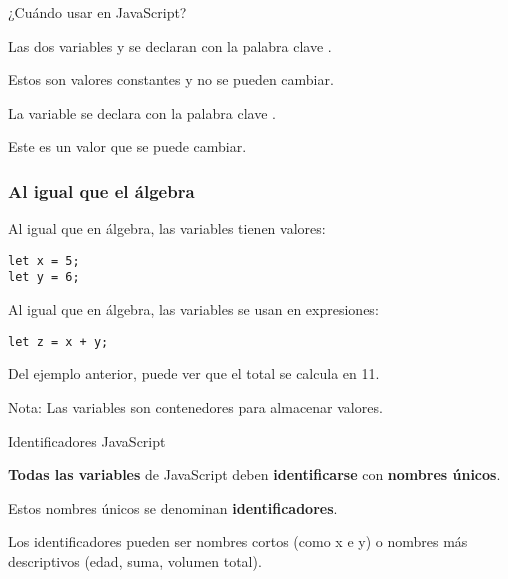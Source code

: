 \begin{frame}[c]{¿Cuándo usar  en JavaScript?}

  Las dos variables  y  se
  declaran con la palabra clave .

  \vspace{\baselineskip}
  Estos son valores constantes y no se pueden cambiar.

  \vspace{\baselineskip}
  La variable  se declara con la palabra clave .

  \vspace{\baselineskip}
  Este es un valor que se puede cambiar.
\end{frame}

\begin{frame}[fragile]
  \frametitle{Al igual que el álgebra}

  Al igual que en álgebra, las variables tienen valores:

  \vspace{\baselineskip}
  \begin{lstlisting}
let x = 5;
let y = 6;
  \end{lstlisting}

  \vspace{\baselineskip}
  Al igual que en álgebra, las variables se usan en expresiones:

  \vspace{\baselineskip}
  \begin{lstlisting}
let z = x + y;
  \end{lstlisting}

  \vspace{\baselineskip}
  Del ejemplo anterior, puede ver que el total se calcula en 11.

  \begin{exampleblock}{Nota:}
    Las variables son contenedores para almacenar valores.
  \end{exampleblock}
\end{frame}

\begin{frame}[c]{Identificadores JavaScript}

  \textbf{Todas las variables} de JavaScript deben
  \textbf{identificarse} con \textbf{nombres únicos}.

  \vspace{\baselineskip}
  Estos nombres únicos se denominan \textbf{identificadores}.

  \vspace{\baselineskip}
  Los identificadores pueden ser nombres cortos (como x e y)
  o nombres más descriptivos (edad, suma, volumen total).
\end{frame}

